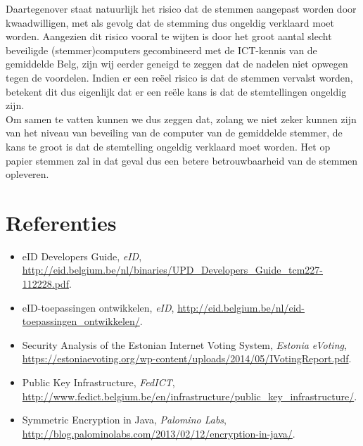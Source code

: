 \documentclass[a4paper,12pt]{article}
\begin{document}
Daartegenover staat natuurlijk het risico dat de stemmen aangepast worden door
kwaadwilligen, met als gevolg dat de stemming dus ongeldig verklaard moet
worden.  Aangezien dit risico vooral te wijten is door het groot aantal slecht
beveiligde (stemmer)computers gecombineerd met de ICT-kennis van de gemiddelde
Belg, zijn wij eerder geneigd te zeggen dat de nadelen niet opwegen tegen de
voordelen. Indien er een re\"eel risico is dat de stemmen vervalst worden,
betekent dit dus eigenlijk dat er een re\"ele kans is dat de stemtellingen
ongeldig zijn. \\
Om samen te vatten kunnen we dus zeggen dat, zolang we niet zeker kunnen zijn
van het niveau van beveiling van de computer van de gemiddelde stemmer, de kans
te groot is dat de stemtelling ongeldig verklaard moet worden. Het op papier
stemmen zal in dat geval dus een betere betrouwbaarheid van de stemmen
opleveren.

\newpage

\section{Referenties}

\begin{itemize}[leftmargin=*]
  \item eID Developers Guide, \emph{eID},
    \url{http://eid.belgium.be/nl/binaries/UPD_Developers_Guide_tcm227-112228.pdf}.
  \item eID-toepassingen ontwikkelen, \emph{eID},
    \url{http://eid.belgium.be/nl/eid-toepassingen_ontwikkelen/}.
  \item Security Analysis of the Estonian Internet Voting System,
    \emph{Estonia eVoting},
    \url{https://estoniaevoting.org/wp-content/uploads/2014/05/IVotingReport.pdf}.
  \item Public Key Infrastructure, \emph{FedICT},
    \url{http://www.fedict.belgium.be/en/infrastructure/public_key_infrastructure/}.
  \item Symmetric Encryption in Java, \emph{Palomino Labs},
    \url{http://blog.palominolabs.com/2013/02/12/encryption-in-java/}.
\end{itemize}
\end{document}

